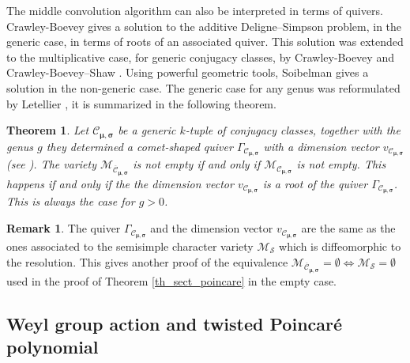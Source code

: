 \documentclass[11pt]{article}
\newcommand{\Subsection}{\subsection}
\theoremstyle{definition}
\newtheorem{remark}[definition]{Remark}
\theoremstyle{plain}
\newtheorem{theorem}[definition]{Theorem}
\newcommand{\mcmus}{\mathcal{M}_{\overline{\mathcal{C}}_{\boldsymbol{\mu},\boldsymbol{\sigma}}}}
\newcommand{\cmus}{\mathcal{C}_{\boldsymbol{\mu},\boldsymbol{\sigma}}}
\begin{document}
The middle convolution algorithm can also be interpreted in terms of quivers. Crawley-Boevey \cite{Crawley-Boevey2003} gives a solution to the additive Deligne--Simpson problem, in the generic case, in terms of roots of an associated quiver. This solution was extended to the multiplicative case, for generic conjugacy classes, by Crawley-Boevey \cite[Th.\,8.3]{Crawley-Boevey_parabolic} and Crawley-Boevey--Shaw \cite{Crawley-Boevey_Shaw}. Using powerful geometric tools, Soibelman \cite{Soibelman16,Soibelman18} gives a solution in the non-generic case.
The generic case for any genus was reformulated by Letellier \cite[Th.\,4.1.7]{Letellier_gl} \cite[Cor.\,3.15]{Letellier13}, it is summarized in the following theorem.
\begin{theorem}
Let $\mathcal{C}_{\boldsymbol{\mu},\boldsymbol{\sigma}}$ be a generic $k$-tuple of conjugacy classes, together with the genus $g$ they determined a comet-shaped quiver $\Gamma_{\cmus}$ with a dimension vector $v_{\cmus}$ (see \cite[\S 3.2]{Letellier13}). The variety $\mathcal{M}_{\overline{\mathcal{C}}_{\boldsymbol{\mu},\boldsymbol{\sigma}}}$ is not empty if and only if $\mathcal{M}_{\mathcal{C}_{\boldsymbol{\mu},\boldsymbol{\sigma}}}$ is not empty. This happens if and only if the the dimension vector $v_{\mathcal{C}_{\boldsymbol{\mu},\boldsymbol{\sigma}}}$ is a root of the quiver $\Gamma_{\mathcal{C}_{\boldsymbol{\mu},\boldsymbol{\sigma}}}$. This is always the case for $g>0$.
\end{theorem}
\begin{remark}
The quiver $\Gamma_{\cmus}$ and the dimension vector $v_{\cmus}$ are the same as the ones associated to the semisimple character variety $\mathcal{M}_{\boldsymbol{\mathcal{S}}}$ which is diffeomorphic to the resolution. This gives another proof of the equivalence $\mcmus = \emptyset \Leftrightarrow \mathcal{M}_{\boldsymbol{\mathcal{S}}} = \emptyset$ used in the proof of Theorem \ref{th_sect_poincare} in the empty case.
\end{remark}

\Subsection{Weyl group action and twisted Poincaré polynomial}\label{subsect_twisted_poincare}
\end{document}
